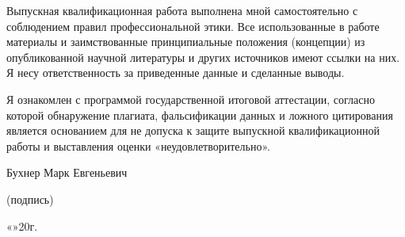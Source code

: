 Выпускная квалификационная работа выполнена мной самостоятельно с соблюдением правил профессиональной этики. Все использованные в работе материалы и заимствованные принципиальные положения (концепции) из опубликованной научной литературы и других источников имеют ссылки на них. Я несу ответственность за приведенные данные и сделанные выводы.

Я ознакомлен с программой государственной итоговой аттестации, согласно которой обнаружение плагиата, фальсификации данных и ложного цитирования является основанием для не допуска к защите выпускной квалификационной работы и выставления оценки «неудовлетворительно».

\vspace{3em}
\noindent
Бухнер Марк Евгеньевич \hspace*{\fill} \makebox[5cm]{\hrulefill}\\
\vspace{-3em}
\begin{flushright}
			\footnotesize (подпись)~~~~~~~~~~~~~~~
\end{flushright}

\noindent
«\makebox[0.7cm]{\hrulefill}»\makebox[3cm]{\hrulefill}20\makebox[0.7cm]{\hrulefill}г. 
